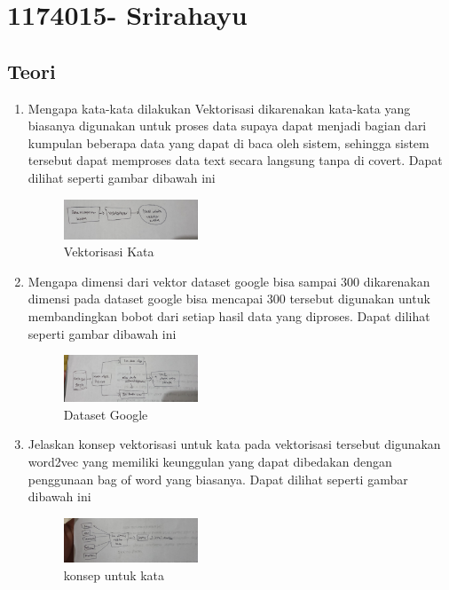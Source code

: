 \section{1174015-  Srirahayu}
    \subsection{Teori}
    \begin{enumerate}
        \item Mengapa kata-kata dilakukan Vektorisasi
        \subitem dikarenakan kata-kata yang biasanya digunakan untuk proses data supaya dapat menjadi bagian dari kumpulan beberapa data yang dapat di baca oleh sistem, sehingga sistem tersebut dapat memproses data text secara langsung tanpa di covert. Dapat dilihat seperti gambar dibawah ini
        \begin{figure}[H]
            \includegraphics[width=4cm]{figures/1174015/5/teori1.jpeg}
            \centering
            \caption{Vektorisasi Kata}
        \end{figure}
        
        \item Mengapa dimensi dari vektor dataset google bisa sampai 300
        \subitem dikarenakan dimensi pada dataset google bisa mencapai 300 tersebut digunakan untuk membandingkan bobot dari setiap hasil data yang diproses. Dapat dilihat seperti gambar dibawah ini
        \begin{figure}[H]
            \includegraphics[width=4cm]{figures/1174015/5/teori2.jpeg}
            \centering
            \caption{Dataset Google}
        \end{figure}
        
        \item Jelaskan konsep vektorisasi untuk kata
        \subitem pada vektorisasi tersebut digunakan word2vec yang memiliki keunggulan yang dapat dibedakan dengan penggunaan bag of word yang biasanya. Dapat dilihat seperti gambar dibawah ini
        \begin{figure}[H]
            \includegraphics[width=4cm]{figures/1174015/5/teori3.jpeg}
            \centering
            \caption{konsep untuk kata}
        \end{figure}
        

\end{enumerate}
